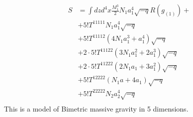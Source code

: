 \documentclass[11pt]{report}
\numberwithin{equation}{chapter}
\begin{document}
\begin{align}
    S&=\int dzd^4x\frac{M_1^{3}}{2}N_1a_1^4\sqrt{-q}R(g_{(1)})+ \\ \nonumber
     &+5!T^{11111}N_1a_1^4\sqrt{-q}\\ \nonumber
     &+5!T^{11112}\left(4N_1a_1^3+a_1^4\right)\sqrt{-q}\\ \nonumber
     &+2\cdot5!T^{11122}\left(3N_1a_1^2+2a_1^3\right)\sqrt{-q}\\ \nonumber
     &+2\cdot5!T^{11222}\left(2N_1a_1+3a_1^2\right)\sqrt{-q}\\ \nonumber
     &+5!T^{12222}\left(N_1a+4a_1\right)\sqrt{-q}\\ \nonumber
     &+5!T^{22222}N_2a_2^4\sqrt{-q}\\ \nonumber
\end{align}
This is a model of Bimetric massive gravity in 5 dimensions.
\end{document}
